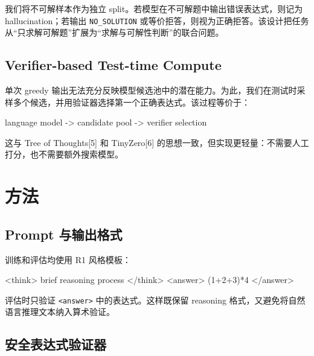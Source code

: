 \documentclass[UTF8,a4paper,12pt]{ctexart}
\newenvironment{Shaded}{}{}
\newcommand{\NormalTok}[1]{#1}
\renewenvironment{Shaded}{\vspace{0.35em}\begin{tcolorbox}[enhanced,breakable,colback=zjucodebg,colframe=zjucodeframe,boxrule=0.45pt,leftrule=2.2pt,arc=1.6mm,left=1.8mm,right=1.8mm,top=1.2mm,bottom=1.2mm]}{\end{tcolorbox}\vspace{0.25em}}
\begin{document}
我们将不可解样本作为独立 split。若模型在不可解题中输出错误表达式，则记为 hallucination；若输出 \texttt{NO\_SOLUTION} 或等价拒答，则视为正确拒答。该设计把任务从``只求解可解题''扩展为``求解与可解性判断''的联合问题。

\subsection{Verifier-based Test-time Compute}\label{verifier-based-test-time-compute}

单次 greedy 输出无法充分反映模型候选池中的潜在能力。为此，我们在测试时采样多个候选，并用验证器选择第一个正确表达式。该过程等价于：

\begin{Shaded}
\begin{Highlighting}[]
\NormalTok{language model {-}\textgreater{} candidate pool {-}\textgreater{} verifier selection}
\end{Highlighting}
\end{Shaded}

这与 Tree of Thoughts{[}5{]} 和 TinyZero{[}6{]} 的思想一致，但实现更轻量：不需要人工打分，也不需要额外搜索模型。

\section{方法}\label{ux65b9ux6cd5}

\subsection{Prompt 与输出格式}\label{prompt-ux4e0eux8f93ux51faux683cux5f0f}

训练和评估均使用 R1 风格模板：

\begin{Shaded}
\begin{Highlighting}[]
\NormalTok{\textless{}think\textgreater{}}
\NormalTok{brief reasoning process}
\NormalTok{\textless{}/think\textgreater{}}
\NormalTok{\textless{}answer\textgreater{}}
\NormalTok{(1+2+3)*4}
\NormalTok{\textless{}/answer\textgreater{}}
\end{Highlighting}
\end{Shaded}

评估时只验证 \texttt{\textless{}answer\textgreater{}} 中的表达式。这样既保留 reasoning 格式，又避免将自然语言推理文本纳入算术验证。

\subsection{安全表达式验证器}\label{ux5b89ux5168ux8868ux8fbeux5f0fux9a8cux8bc1ux5668}
\end{document}
